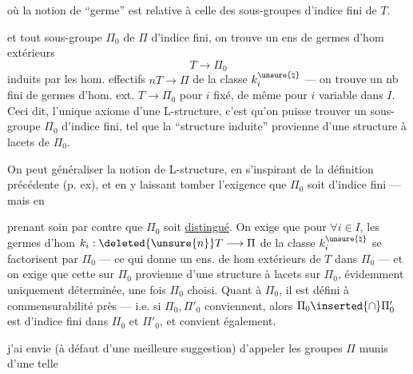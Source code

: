 où la notion de ``germe'' est relative à celle des sous-groupes d'indice fini de $T$.  


et tout sous-groupe  $\Pi_0$ de $\Pi$ d'indice fini, on trouve  un ens de germes d'hom extérieurs
\[
T\longrightarrow\Pi_0
\]
induits par les hom.  effectifs $nT\longrightarrow\Pi$ de la classe $k_i^{\unsure{\natural}}$ --- on trouve un nb fini de germes d'hom. ext. $T\longrightarrow\Pi_0$ pour $i$ fixé, de même pour $i$ variable dans $I$. Ceci dit, l'unique axiome d'une L-structure, c'est qu'on puisse trouver un sous-groupe $\Pi_0$ d'indice fini, tel que la ``structure induite'' provienne d'une structure à lacets de $\Pi_0$.

On peut généraliser la notion de L-structure, en s'inspirant de la définition précédente (p. ex), et en y laissant tomber l'exigence que $\Pi_0$ soit d'indice fini --- mais en


prenant soin par contre que $\Pi_0$ soit \uline{distingué}. On exige que  pour $\forall i\in I$, les germes d'hom $k_i:\deleted{\unsure{n}}T\longrightarrow\Pi$ de la classe $k_i^{\unsure{\natural}}$ se factorisent par $\Pi_0$ --- ce qui donne un ens. de hom extérieurs de $T$ dans $\Pi_0$ ---
et on exige que cette   sur $\Pi_0$ provienne  d'une structure à lacets sur $\Pi_0$, \unsure{$\xi$|\&} évidemment uniquement déterminée, une fois $\Pi_0$ choisi. Quant à $\Pi_0$, il est défini à commensurabilité près --- i.e. si $\Pi_0,\Pi'_0$ conviennent, alors $\Pi_0\inserted{\cap}\Pi'_0$ est d'indice fini dans $\Pi_0$ et $\Pi'_0$, et convient également.

 j'ai envie (à défaut d'une meilleure suggestion) d'appeler les groupes $\Pi$ munis d'une telle
